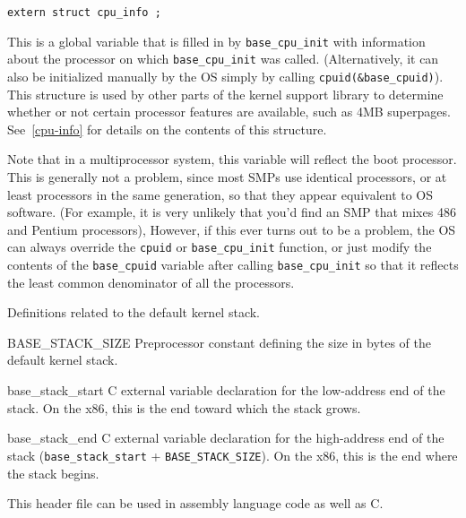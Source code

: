\label{base-cpuid}
\begin{apisyn}

	{\tt extern struct cpu_info ;}
\end{apisyn}
\begin{apidesc}
	This is a global variable that is filled in by {\tt base_cpu_init}
	with information about the processor
	on which {\tt base_cpu_init} was called.
	(Alternatively, it can also be initialized manually by the OS
	simply by calling {\tt cpuid(\&base_cpuid)}).
	This structure is used by other parts of the kernel support library
	to determine whether or not certain processor features are available,
	such as 4MB superpages.
	See~\ref{cpu-info} for details on the contents of this structure.

	Note that in a multiprocessor system,
	this variable will reflect the boot processor.
	This is generally not a problem,
	since most SMPs use identical processors,
	or at least processors in the same generation,
	so that they appear equivalent to OS software.
	(For example, it is very unlikely that you'd find an SMP
	that mixes 486 and Pentium processors),
	However, if this ever turns out to be a problem,
	the OS can always override
	the {\tt cpuid} or {\tt base_cpu_init} function,
	or just modify the contents of the {\tt base_cpuid} variable
	after calling {\tt base_cpu_init}
	so that it reflects the least common denominator of all the processors.
\end{apidesc}

\begin{apisyn}
\end{apisyn}
\begin{apidesc}
	Definitions related to the default kernel stack.
	\begin{csymlist}
	\item[BASE_STACK_SIZE]		
		Preprocessor constant defining the size in bytes
		of the default kernel stack.
	\item[base_stack_start]		
		C external variable declaration for
		the low-address end of the stack.
		On the x86, this is the end toward which the stack grows.
	\item[base_stack_end]		
		C external variable declaration for
		the high-address end of the stack
		(\texttt{base_stack_start} + \texttt{BASE_STACK_SIZE}).
		On the x86, this is the end where the stack begins.
	\end{csymlist}

	This header file can be used in assembly language code as well as C.
\end{apidesc}

